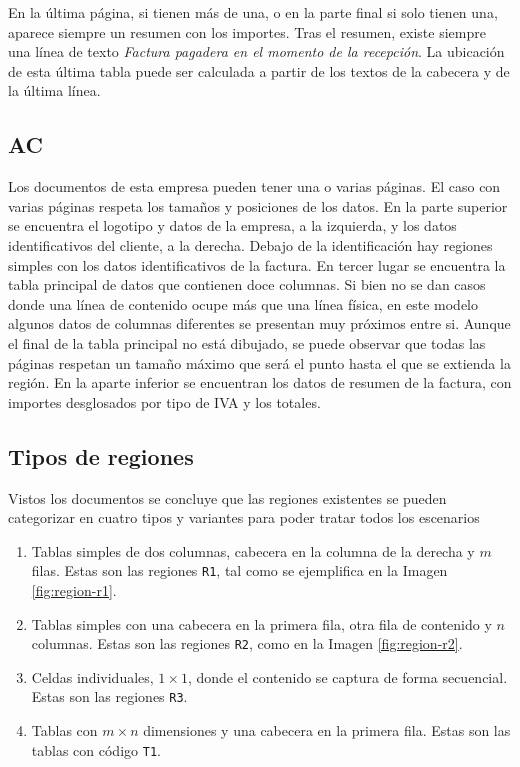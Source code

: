 En la última página, si tienen más de una, o en la parte final si solo tienen una, aparece siempre un resumen con los importes. Tras el resumen, existe siempre una línea de texto \emph{Factura pagadera en el momento de la recepción}. La ubicación de esta última tabla puede ser calculada a partir de los textos de la cabecera y de la última línea.

\subsection{AC}

Los documentos de esta empresa pueden tener una o varias páginas. El caso con varias páginas respeta los tamaños y posiciones de los datos. En la parte superior se encuentra el logotipo y datos de la empresa, a la izquierda, y los datos identificativos del cliente, a la derecha. Debajo de la identificación hay regiones simples con los datos identificativos de la factura. En tercer lugar se encuentra la tabla principal de datos que contienen doce columnas. Si bien no se dan casos donde una línea de contenido ocupe más que una línea física, en este modelo algunos datos de columnas diferentes se presentan muy próximos entre si. Aunque el final de la tabla principal no está dibujado, se puede observar que todas las páginas respetan un tamaño máximo que será el punto hasta el que se extienda la región. En la aparte inferior se encuentran los datos de resumen de la factura, con importes desglosados por tipo de IVA y los totales.
 
\subsection{Tipos de regiones}

Vistos los documentos se concluye que las regiones existentes se pueden categorizar en cuatro tipos y variantes para poder tratar todos los escenarios

\begin{enumerate}
	\item Tablas simples de dos columnas, cabecera en la columna de la derecha y $m$ filas. Estas son las regiones \verb|R1|, tal como se ejemplifica en la Imagen \ref{fig:region-r1}.
	\item Tablas simples con una cabecera en la primera fila, otra fila de contenido y $n$ columnas. Estas son las regiones \verb|R2|, como en la Imagen \ref{fig:region-r2}.
	\item Celdas individuales, $1\times 1$, donde el contenido se captura de forma secuencial. Estas son las regiones \verb|R3|.
	\item Tablas con $m\times n$ dimensiones y una cabecera en la primera fila. Estas son las tablas con código \verb|T1|.
\end{enumerate}

